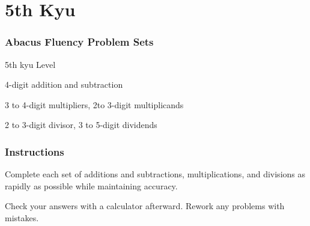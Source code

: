 \hypertarget{th-kyu}{%
\section{5th Kyu}\label{th-kyu}}

\hypertarget{abacus-fluency-problem-sets}{%
\subsubsection{Abacus Fluency Problem
Sets}\label{abacus-fluency-problem-sets}}

5th kyu Level

4-digit addition and subtraction

3 to 4-digit multipliers, 2to 3-digit multiplicands

2 to 3-digit divisor, 3 to 5-digit dividends

\hypertarget{instructions}{%
\subsubsection{Instructions}\label{instructions}}

Complete each set of additions and subtractions, multiplications, and
divisions as rapidly as possible while maintaining accuracy.

Check your answers with a calculator afterward. Rework any problems with
mistakes.
